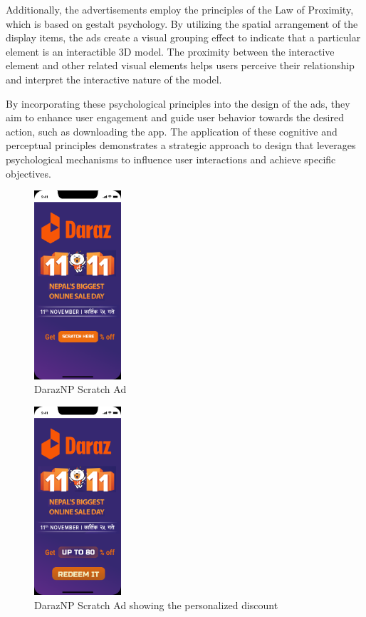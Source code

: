 \documentclass[journal]{IEEEtran}
\begin{document}
Additionally, the advertisements employ the principles of the Law of Proximity, which is
based on gestalt psychology. By utilizing the spatial arrangement of the display items,
the ads create a visual grouping effect to indicate that a particular element is an
interactible 3D model. The proximity between the interactive element and other related
visual elements helps users perceive their relationship and interpret the interactive
nature of the model.

By incorporating these psychological principles into the design of the ads, they aim to
enhance user engagement and guide user behavior towards the desired action, such as
downloading the app. The application of these cognitive and perceptual principles
demonstrates a strategic approach to design that leverages psychological mechanisms to
influence user interactions and achieve specific objectives.

\begin{figure}[H]
    \centering
    \includegraphics[height=7cm]{DarazScratch1.png}
    \caption{DarazNP Scratch Ad}
\end{figure}

\begin{figure}[H]
    \centering
    \includegraphics[height=7cm]{DarazScratch2.png}
    \caption{DarazNP Scratch Ad showing the personalized discount}
\end{figure}
\end{document}
